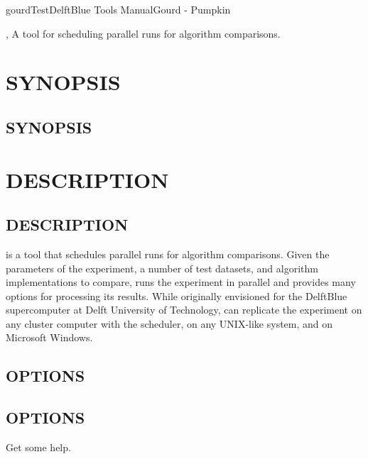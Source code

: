 \documentclass[a4paper,english]{article}
\begin{document}
	\pagestyle{fancy}

  \begin{Name}{1}{gourd}{Test}{DelftBlue Tools Manual}{Gourd - Pumpkin}
    \begin{adjustwidth}{18pt}{0pt}
      , A tool for scheduling parallel runs for algorithm comparisons.
    \end{adjustwidth}
  \end{Name}

  \section*{SYNOPSIS}
    \begin{adjustwidth}{18pt}{0pt}
  \section{SYNOPSIS}

      \noindent {}  


    \end{adjustwidth}

  \section*{DESCRIPTION}
    \begin{adjustwidth}{18pt}{0pt}
  \section{DESCRIPTION}

      \noindent {} is a tool that schedules parallel runs for algorithm comparisons. Given the parameters of the experiment, a number of test datasets, and algorithm implementations to compare,  runs the experiment in parallel and provides many options for processing its results. While originally envisioned for the DelftBlue supercomputer at Delft University of Technology,  can replicate the experiment on any cluster computer with the  scheduler, on any UNIX-like system, and on Microsoft Windows.

      \subsection*{OPTIONS}
      \subsection{OPTIONS}

        \begin{Description}[Options]\setlength{\itemsep}{0cm}
        \item[\Opt{-h}] Get some help.
        \end{Description}

    \end{adjustwidth}
\end{document}
